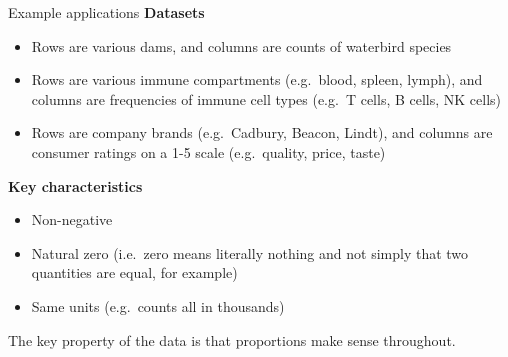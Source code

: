 \documentclass[
  ignorenonframetext,
  aspectratio=169]{beamer}
\providecommand{\tightlist}{%
  \setlength{\itemsep}{0pt}\setlength{\parskip}{0pt}}\usepackage{longtable,booktabs,array}
\begin{document}
\begin{frame}{Example applications}
\protect\hypertarget{example-applications}{}
\textbf{Datasets}

\begin{itemize}
\tightlist
\item
  Rows are various dams, and columns are counts of waterbird species
\item
  Rows are various immune compartments (e.g.~blood, spleen, lymph), and
  columns are frequencies of immune cell types (e.g.~T cells, B cells,
  NK cells)
\item
  Rows are company brands (e.g.~Cadbury, Beacon, Lindt), and columns are
  consumer ratings on a 1-5 scale (e.g.~quality, price, taste)
\end{itemize}

\textbf{Key characteristics}

\begin{itemize}
\tightlist
\item
  Non-negative
\item
  Natural zero (i.e.~zero means literally nothing and not simply that
  two quantities are equal, for example)
\item
  Same units (e.g.~counts all in thousands)
\end{itemize}

The key property of the data is that proportions make sense throughout.
\end{frame}
\end{document}
